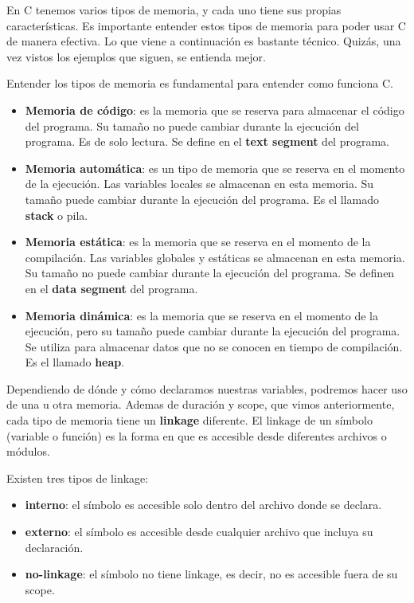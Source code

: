 \documentclass[]{scrartcl}
\begin{document}
En C tenemos varios tipos de memoria, y cada uno tiene sus propias características. Es importante entender estos tipos de memoria para poder usar C de manera efectiva. Lo que viene a continuación es bastante técnico. Quizás, una vez vistos los ejemplos que siguen, se entienda mejor.

\begin{importantbox}
  \centering
  Entender los tipos de memoria es fundamental para entender como funciona C.
\end{importantbox}

\begin{itemize}
  \item \textbf{Memoria de código}: es la memoria que se reserva para almacenar el código del programa. Su tamaño no puede cambiar durante la ejecución del programa. Es de solo lectura. Se define en el \textbf{text segment} del programa.
  \item \textbf{Memoria automática}: es un tipo de memoria que se reserva en el momento de la ejecución. Las variables locales se almacenan en esta memoria. Su tamaño puede cambiar durante la ejecución del programa. Es el llamado \textbf{stack} o pila.
    \item \textbf{Memoria estática}: es la memoria que se reserva en el momento de la compilación. Las variables globales y estáticas se almacenan en esta memoria. Su tamaño no puede cambiar durante la ejecución del programa. Se definen en el \textbf{data segment} del programa.
    \item \textbf{Memoria dinámica}: es la memoria que se reserva en el momento de la ejecución, pero su tamaño puede cambiar durante la ejecución del programa. Se utiliza para almacenar datos que no se conocen en tiempo de compilación. Es el llamado \textbf{heap}.
  \end{itemize}
  
Dependiendo de dónde y cómo declaramos nuestras variables, podremos hacer uso de una u otra memoria. Ademas de duración y scope, que vimos anteriormente, cada tipo de memoria tiene un \textbf{linkage} diferente. El linkage de un símbolo (variable o función) es la forma en que es  accesible desde diferentes archivos o módulos. 

Existen tres tipos de linkage:
\begin{itemize}
  \item \textbf{interno}: el símbolo es accesible solo dentro del archivo donde se declara.
  \item \textbf{externo}: el símbolo es accesible desde cualquier archivo que incluya su declaración.
  \item \textbf{no-linkage}: el símbolo no tiene linkage, es decir, no es accesible fuera de su scope.
\end{itemize}
\end{document}
